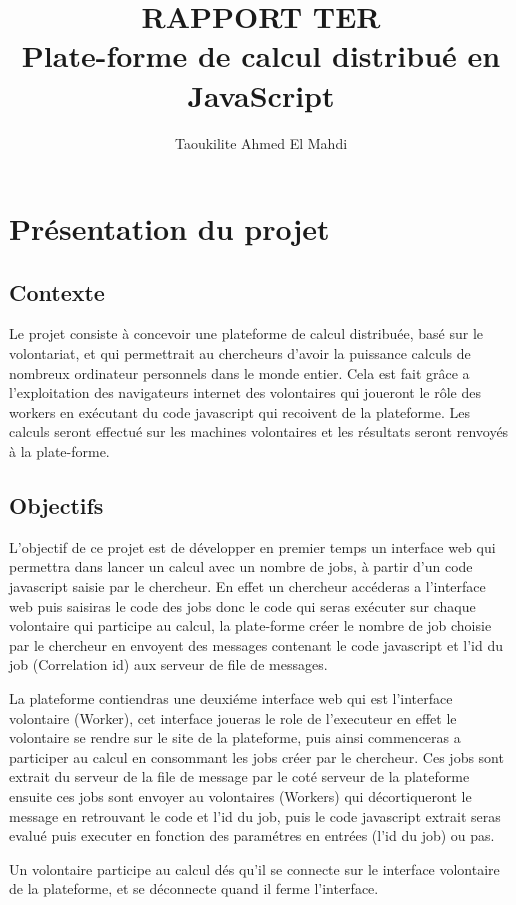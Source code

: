 \documentclass[a4paper]{article}
\title{RAPPORT TER\\Plate-forme de calcul distribué en JavaScript}
\author{Taoukilite Ahmed El Mahdi}
\begin{document}
\maketitle

\section{Présentation du projet}
\subsection{Contexte}
Le projet consiste à concevoir une plateforme de calcul distribuée, basé sur le volontariat, et qui permettrait au chercheurs d'avoir la puissance calculs de nombreux ordinateur personnels dans le monde entier. Cela est fait grâce a l'exploitation des navigateurs internet des volontaires qui joueront le rôle des workers en exécutant du code javascript qui recoivent de la plateforme. Les calculs seront effectué sur les machines volontaires et les résultats seront renvoyés à la plate-forme.

\subsection{Objectifs}
L'objectif de ce projet est de développer en premier temps un interface web qui permettra dans lancer un calcul avec un nombre de jobs, à partir d'un code javascript saisie par le chercheur. En effet un chercheur accéderas a l'interface web  puis saisiras le code des jobs donc le code qui seras exécuter sur chaque volontaire qui participe au calcul, la plate-forme créer le nombre de job choisie par le chercheur en envoyent des messages contenant le code javascript et l'id du job (Correlation id) aux serveur de file de messages.

La plateforme contiendras une deuxiéme interface web qui est l'interface volontaire (Worker), cet interface joueras le role de l'executeur en effet le volontaire se rendre sur le site de la plateforme, puis ainsi commenceras a participer au calcul en consommant les jobs créer par le chercheur. Ces jobs sont extrait du serveur de la file de message par le coté serveur de la plateforme ensuite ces jobs sont envoyer au volontaires (Workers) qui décortiqueront le message en retrouvant le code et l'id du job, puis le code javascript extrait seras evalué puis executer en fonction des paramétres en entrées (l'id du job) ou pas.

Un volontaire participe au calcul dés qu'il se connecte sur le interface volontaire de la plateforme, et se déconnecte quand il ferme l'interface.
\end{document}
